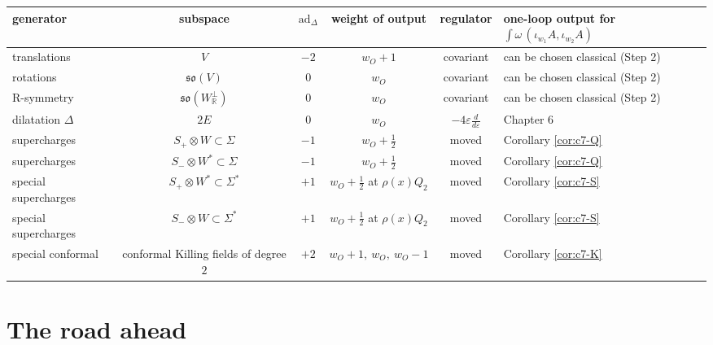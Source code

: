 \begin{remark}
\begin{itemize}
\end{itemize}
\end{remark}

\begin{tabular}{l|c|c|c|c|l}
generator & subspace & $\mathrm{ad}_\Delta$ & weight of output & regulator & one-loop output for $\int\omega\,(\iota_{w_1}A,\iota_{w_2}A)$ \\
\hline
translations & $V$ & $-2$ & $w_O+1$ & covariant & can be chosen classical (Step 2) \\
rotations & $\mathfrak{so}(V)$ & $0$ & $w_O$ & covariant & can be chosen classical (Step 2) \\
R-symmetry & $\mathfrak{so}(W_{\mathbb R}^\perp)$ & $0$ & $w_O$ & covariant & can be chosen classical (Step 2) \\
dilatation $\Delta$ & $2E$ & $0$ & $w_O$ & $-4\varepsilon\frac{d}{d\varepsilon}$ & Chapter 6 \\
supercharges & $S_+\otimes W\subset\Sigma$ & $-1$ & $w_O+\frac12$ & moved & Corollary \ref{cor:c7-Q} \\
supercharges & $S_-\otimes W^*\subset\Sigma$ & $-1$ & $w_O+\frac12$ & moved & Corollary \ref{cor:c7-Q} \\
special supercharges & $S_+\otimes W^*\subset\Sigma^*$ & $+1$ & $w_O+\frac12$ at $\rho(x)Q_2$ & moved & Corollary \ref{cor:c7-S} \\
special supercharges & $S_-\otimes W\subset\Sigma^*$ & $+1$ & $w_O+\frac12$ at $\rho(x)Q_2$ & moved & Corollary \ref{cor:c7-S} \\
special conformal & conformal Killing fields of degree $2$ & $+2$ & $w_O+1,\ w_O,\ w_O-1$ & moved & Corollary \ref{cor:c7-K} \\
\end{tabular}

\section{The road ahead}

